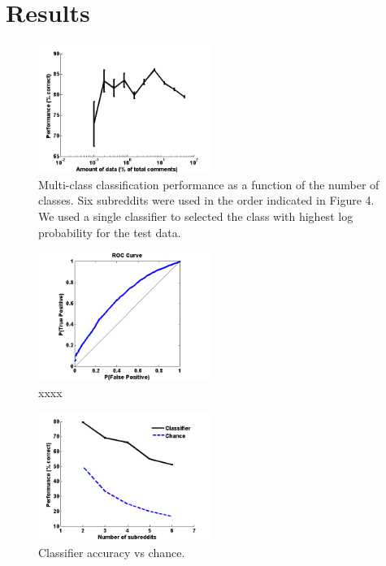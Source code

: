 \documentclass[10pt,twocolumn]{article}
\begin{document}
\section{Results}
\begin{figure}
    \centering
  	\includegraphics[width=0.5\textwidth]{./binary_data.png}
  	\caption{Multi-class classification performance as a function of the number of classes. Six subreddits were used in the order indicated in Figure 4. We used a single classifier to selected the class with highest log probability for the test data.}
  	\label{multiclass}
\end{figure}		
\begin{figure}
    \centering
  	\includegraphics[width=0.5\textwidth]{./roc.png}
  	\caption{xxxx}
  	\label{roc}
\end{figure}		
		
\begin{figure}
    \centering
  	\includegraphics[width=0.5\textwidth]{./varyWBaseline.png}
  	\caption{Classifier accuracy vs chance.}
  	\label{}
\end{figure}	
\end{document}

